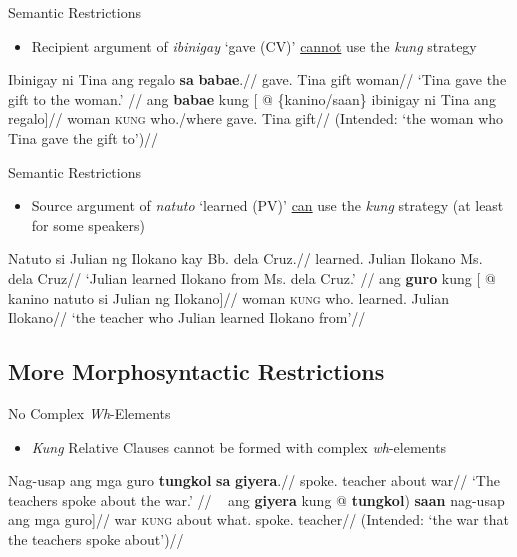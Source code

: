 \documentclass[pdf]{beamer}
\newcommand{\g}[1]{\textsc{#1}}
\newcommand{\glp}[3][ ]{\textit{#2}#1`#3'}
\newcommand{\texthl}[1]{\textcolor{cyan!75!blue}{\textbf{#1}}}
\begin{document}
\begin{frame}{Semantic Restrictions}
  \begin{itemize}
    \item Recipient argument of \glp{ibinigay}{gave (CV)} \uline{cannot} use the \textit{kung} strategy
  \end{itemize}
  \ex\begingl
    \gla  Ibinigay ni Tina ang regalo \texthl{sa} \texthl{babae}.//
    \glb  gave.\Cv{} \Gen{} Tina \Nom{} gift \Obl{} woman//
    \glft `Tina gave the gift to the woman.'
          //
  \endgl
  \xe
  \ex\ljudge{*}\begingl
    \gla  ang \texthl{babae} kung [ @ \{kanino/saan\} ibinigay ni Tina ang regalo]//
    \glb  \Nom{} woman \g{kung} who.\Obl{}/where gave.\Cv{} \Gen{} Tina \Nom{} gift//
    \glft (Intended: `the woman who Tina gave the gift to')//
  \endgl
  \xe
\end{frame}

\begin{frame}{Semantic Restrictions}
  \begin{itemize}
    \item Source argument of \glp{natuto}{learned (PV)} \uline{can} use the \textit{kung} strategy (at least for some speakers)
  \end{itemize}

  \ex\begingl
    \gla  Natuto si Julian ng Ilokano kay Bb. dela Cruz.//
    \glb  learned.\Pv{} \Nom{} Julian \Gen{} Ilokano \Obl{} Ms. dela Cruz//
    \glft `Julian learned Ilokano from Ms. dela Cruz.'
          //
  \endgl
  \xe
  \ex{}\begingl
    \gla  ang \texthl{guro} kung [ @ kanino natuto si Julian ng Ilokano]//
    \glb  \Nom{} woman \g{kung} who.\Obl{} learned.\Pv{} \Nom{} Julian \Gen{} Ilokano//
    \glft `the teacher who Julian learned Ilokano from'//
  \endgl
  \xe
\end{frame}

\subsection{More Morphosyntactic Restrictions}

\begin{frame}{No Complex \textit{Wh}-Elements}
  \begin{itemize}
    \item \textit{Kung} Relative Clauses cannot be formed with complex \textit{wh}-elements
  \end{itemize}

  \ex\begingl
    \gla  Nag-usap ang mga guro \texthl{tungkol} \texthl{sa} \texthl{giyera}.//
    \glb  spoke.\Av{} \Nom{} \Pl{} teacher about \Obl{} war//
    \glft `The teachers spoke about the war.'
          //
  \endgl
  \xe
  \ex~\ljudge{*}\begingl
    \gla  ang \texthl{giyera} kung \nogloss{[(} @ \textbf{tungkol}) \textbf{saan} nag-usap ang mga guro]//
    \glb  \Nom{} war \g{kung} about what.\Obl{} spoke.\Av{} \Nom{} \Pl{} teacher//
    \glft (Intended: `the war that the teachers spoke about')//
  \endgl
  \xe
\end{frame}
\end{document}
